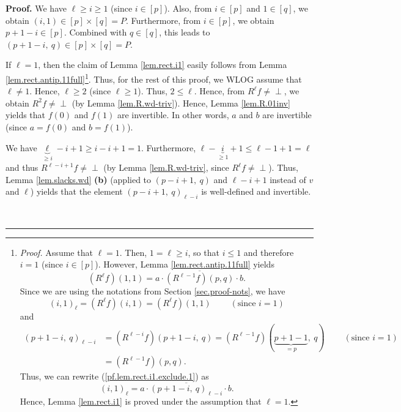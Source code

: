 \documentclass[numbers=enddot,12pt,final,onecolumn,notitlepage]{scrartcl}%
\theoremstyle{definition}
\newenvironment{verlong}{}{}
\newcommand{\undf}{\operatorname*{\bot}}
\newenvironment{proof}[1][Proof]{\noindent\textbf{#1.} }{\ \rule{0.5em}{0.5em}}
\begin{document}
\begin{verlong}


\begin{proof}
We have $\ell\geq i\geq1$ (since $i\in\left[  p\right]  $). Also, from
$i\in\left[  p\right]  $ and $1\in\left[  q\right]  $, we obtain $\left(
i,1\right)  \in\left[  p\right]  \times\left[  q\right]  =P$. Furthermore,
from $i\in\left[  p\right]  $, we obtain $p+1-i\in\left[  p\right]  $.
Combined with $q\in\left[  q\right]  $, this leads to $\left(
p+1-i,\ q\right)  \in\left[  p\right]  \times\left[  q\right]  =P$.

If $\ell=1$, then the claim of Lemma \ref{lem.rect.i1} easily follows from
Lemma \ref{lem.rect.antip.11full}\footnote{\textit{Proof.} Assume that
$\ell=1$. Then, $1=\ell\geq i$, so that $i\leq1$ and therefore $i=1$ (since
$i\in\left[  p\right]  $). However, Lemma \ref{lem.rect.antip.11full} yields%
\begin{equation}
\left(  R^{\ell}f\right)  \left(  1,1\right)  =a\cdot\overline{\left(
R^{\ell-1}f\right)  \left(  p,q\right)  }\cdot b.
\label{pf.lem.rect.i1.exclude.1}%
\end{equation}
Since we are using the notations from Section \ref{sec.proof-nots}, we have
\[
\left(  i,1\right)  _{\ell}=\left(  R^{\ell}f\right)  \left(  i,1\right)
=\left(  R^{\ell}f\right)  \left(  1,1\right)  \ \ \ \ \ \ \ \ \ \ \left(
\text{since }i=1\right)
\]
and
\begin{align*}
\left(  p+1-i,\ q\right)  _{\ell-i}  &  =\left(  R^{\ell-i}f\right)  \left(
p+1-i,\ q\right)  =\left(  R^{\ell-1}f\right)  \left(  \underbrace{p+1-1}%
_{=p},\ q\right)  \ \ \ \ \ \ \ \ \ \ \left(  \text{since }i=1\right) \\
&  =\left(  R^{\ell-1}f\right)  \left(  p,q\right)  .
\end{align*}
Thus, we can rewrite (\ref{pf.lem.rect.i1.exclude.1}) as%
\[
\left(  i,1\right)  _{\ell}=a\cdot\overline{\left(  p+1-i,\ q\right)
_{\ell-i}}\cdot b.
\]
Hence, Lemma \ref{lem.rect.i1} is proved under the assumption that $\ell=1$.}.
Thus, for the rest of this proof, we WLOG assume that $\ell\neq1$. Hence,
$\ell\geq2$ (since $\ell\geq1$). Thus, $2\leq\ell$. Hence, from $R^{\ell}%
f\neq\undf$, we obtain $R^{2}f\neq\undf$ (by Lemma \ref{lem.R.wd-triv}).
Hence, Lemma \ref{lem.R.01inv} yields that $f\left(  0\right)  $ and $f\left(
1\right)  $ are invertible. In other words, $a$ and $b$ are invertible (since
$a=f\left(  0\right)  $ and $b=f\left(  1\right)  $).

We have $\underbrace{\ell}_{\geq i}-i+1\geq i-i+1=1$. Furthermore,
$\ell-\underbrace{i}_{\geq1}+1\leq\ell-1+1=\ell$ and thus $R^{\ell-i+1}%
f\neq\undf$ (by Lemma \ref{lem.R.wd-triv}, since $R^{\ell}f\neq\undf$). Thus,
Lemma \ref{lem.slacks.wd} \textbf{(b)} (applied to $\left(  p-i+1,\ q\right)
$ and $\ell-i+1$ instead of $v$ and $\ell$) yields that the element $\left(
p-i+1,\ q\right)  _{\ell-i}$ is well-defined and invertible.


\end{proof}
\end{verlong}
\end{document}
